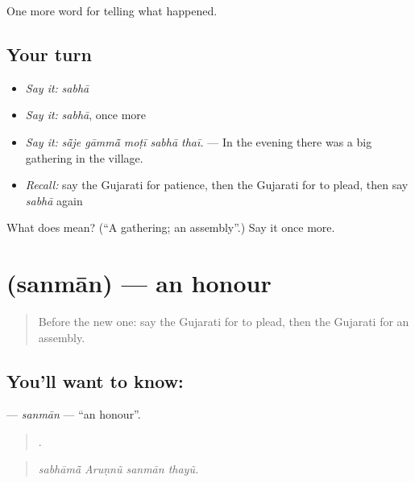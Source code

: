 \begin{grammarlens}[title={What you've built}]
One more word for telling what happened.
\end{grammarlens}

\subsection*{Your turn}
\begin{itemize}
\raggedright
  \item \emph{Say it:} \emph{sabhā}
  \item \emph{Say it:} \emph{sabhā}, once more
  \item \emph{Say it:} \emph{sā̃je gāmmā̃ moṭī sabhā thaī.} — In the evening there was a big gathering in the village.
  \item \emph{Recall:} say the Gujarati for patience, then the Gujarati for to plead, then say \emph{sabhā} again
\end{itemize}

\begin{tcolorbox}[breakable,colback=teal!4,colframe=teal!35!black,title={Before you move on}]
What does  mean? (\textquotedblleft{}A gathering; an assembly\textquotedblright{}.) Say it once more.
\end{tcolorbox}
\section[\texorpdfstring{\gu{સન્માન} (sanmān)}{સન્માન (sanmān)}]{ (sanmān) — an honour}

\label{lesson:GU-C309-sanman}



\begin{quote}
Before the new one: say the Gujarati for to plead, then the Gujarati for an assembly.
\end{quote}

\subsection*{You'll want to know: }
\textbf{} — \emph{sanmān} — \textquotedblleft{}an honour\textquotedblright{}.

\begin{quote}
   .
\end{quote}

\begin{quote}
\emph{sabhāmā̃ Aruṇnũ sanmān thayũ.}
\end{quote}

